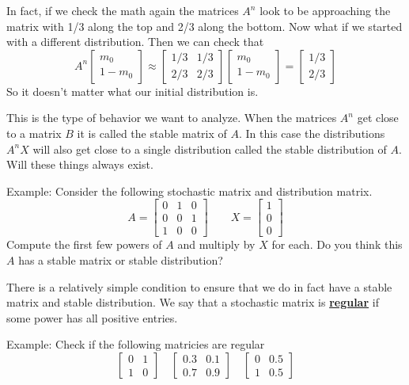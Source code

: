 \documentclass[14,fleqn]{article}
\newcommand{\defn}[1]{\textbf{\underline{#1}}}
\begin{document}
In fact, if we check the math again the matrices $A^n$ look to be approaching the matrix with 1/3 along the top and 2/3 along the bottom. Now what if we started with a different distribution. Then we can check that
\[
	A^n\begin{bmatrix}m_0\\1-m_0\end{bmatrix}\approx \begin{bmatrix}1/3 & 1/3\\2/3&2/3\end{bmatrix}\begin{bmatrix}m_0\\1-m_0\end{bmatrix}=\begin{bmatrix}1/3 \\ 2/3 \end{bmatrix}
\]
So it doesn't matter what our initial distribution is. 

This is the type of behavior we want to analyze. When the matrices $A^n$ get close to a matrix $B$ it is called the stable matrix of $A.$ In this case the distributions $A^nX$ will also get close to a single distribution called the stable distribution of $A.$ Will these things always exist.

Example: Consider the following stochastic matrix and distribution matrix.
\[
	A=\begin{bmatrix}0&1&0\\0&0&1\\1&0&0\end{bmatrix} \qquad X=\begin{bmatrix}1\\0\\0\end{bmatrix}
\]
Compute the first few powers of $A$ and multiply by $X$ for each. Do you think this $A$ has a stable matrix or stable distribution?

There is a relatively simple condition to ensure that we do in fact have a stable matrix and stable distribution. We say that a stochastic matrix is \defn{regular} if some power has all positive entries.

Example: Check if the following matricies are regular
\[
	\begin{bmatrix}0&1\\1&0\end{bmatrix}\quad\begin{bmatrix}0.3&0.1\\0.7&0.9\end{bmatrix}\quad\begin{bmatrix}0&0.5\\1&0.5\end{bmatrix}
\]
\end{document}
